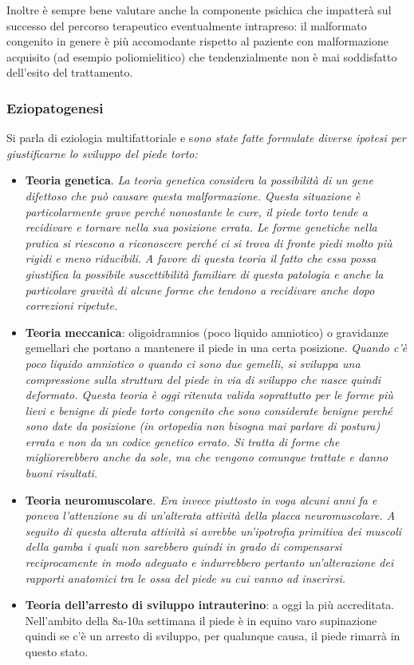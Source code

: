 Inoltre è sempre bene valutare anche la componente psichica che impatterà sul successo del percorso terapeutico eventualmente intrapreso: il malformato congenito in genere è più accomodante rispetto al paziente con malformazione acquisito (ad esempio poliomielitico) che tendenzialmente non è mai soddisfatto dell'esito del trattamento.

\subsubsection{Eziopatogenesi}

Si parla di eziologia multifattoriale e s\emph{ono state fatte formulate diverse ipotesi per giustificarne lo sviluppo del piede torto:}

\begin{itemize}
\item
  \textbf{Teoria genetica}. \emph{La teoria genetica considera la possibilità di un gene difettoso che può causare questa malformazione. Questa situazione è particolarmente grave perché nonostante le cure, il piede torto tende a recidivare e tornare nella sua posizione errata. Le forme genetiche nella pratica si riescono a riconoscere perché ci si trova di fronte piedi molto più rigidi e meno riducibili.} \emph{A favore di questa teoria il fatto che essa possa giustifica la possibile suscettibilità familiare di questa patologia e anche la particolare gravità di alcune forme che tendono a recidivare anche dopo correzioni ripetute.}
\item
  \textbf{Teoria meccanica}: oligoidramnios (poco liquido amniotico) o gravidanze gemellari che portano a mantenere il piede in una certa posizione. \emph{Quando c'è poco liquido amniotico o quando ci sono due gemelli, si sviluppa una compressione sulla struttura del piede in via di sviluppo che nasce quindi deformato. Questa teoria è oggi ritenuta valida soprattutto per le forme più lievi e benigne di piede torto congenito che sono considerate benigne perché sono date da posizione (in ortopedia non bisogna mai parlare di postura) errata e non da un codice genetico errato. Si tratta di forme che migliorerebbero anche da sole, ma che vengono comunque trattate e danno buoni risultati.}
\item
  \textbf{Teoria neuromuscolare}\emph{. Era invece piuttosto in voga alcuni anni fa e poneva l'attenzione su di un'alterata attività della placca neuromuscolare. A seguito di questa alterata attività si avrebbe un'ipotrofia primitiva dei muscoli della gamba i quali non sarebbero quindi in grado di compensarsi reciprocamente in modo adeguato e indurrebbero pertanto un'alterazione dei rapporti anatomici tra le ossa del piede su cui vanno ad inserirsi.}
\item
  \textbf{Teoria dell'arresto di sviluppo intrauterino}: a oggi la più accreditata. Nell'ambito della 8a-10a settimana il piede è in equino varo supinazione quindi se c'è un arresto di sviluppo, per qualunque causa, il piede rimarrà in questo stato.
\end{itemize}

